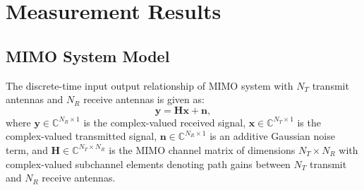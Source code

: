 \documentclass[10pt, final, journal, letterpaper, oneside, twocolumn]{IEEEtran}
\begin{document}
\section{Measurement Results}

\subsection{MIMO System Model}
The discrete-time input output relationship of MIMO system with $N_T$ transmit antennas and $N_R$ receive antennas is given as:
\begin{equation}
    \mathbf{y=Hx+n},
\end{equation}
where $\mathbf{y}\in \mathbb{C}^{N_R\times 1}$ is the complex-valued received signal, $\mathbf{x}\in \mathbb{C}^{N_T\times 1}$ is the complex-valued transmitted signal, $\mathbf{n}\in \mathbb{C}^{N_R\times 1}$ is an additive Gaussian noise term, and $\mathbf{H}\in \mathbb{C}^{N_T\times N_R}$ is the MIMO channel matrix of dimensions $N_T \times N_R$ with complex-valued subchannel elements denoting path gains between $N_T$ transmit and $N_R$ receive antennas.
\end{document}
